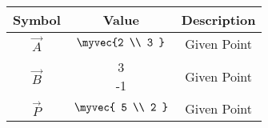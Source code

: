 \begin{tabular}{|c|c|c|}
     \hline
     \textbf{Symbol}& \textbf{Value} & \textbf{Description} \\
     \hline
     $\vec{A}$ & $\myvec{2 \\ 3 }$ & Given Point \\ 
     \hline
     $\vec{B}$  & \myvec{3 \\ -1} & Given Point \\ 
     \hline
     $\vec{P}$ & $\myvec{ 5 \\ 2 }$ & Given Point \\ 
     \hline
\end{tabular}
